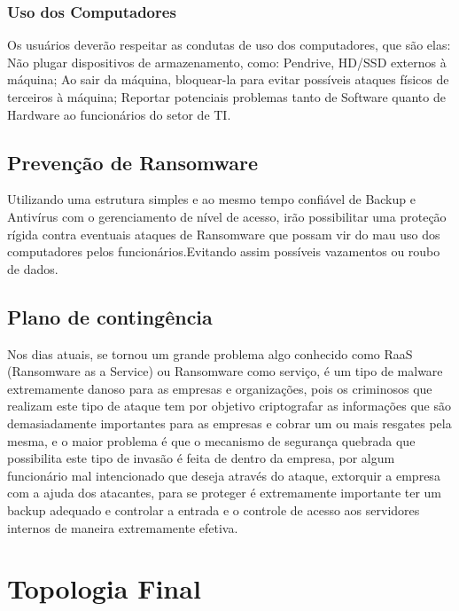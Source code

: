 \documentclass[12pt]{article}
\begin{document}
\subsubsection{Uso dos Computadores}
Os usuários deverão respeitar as condutas de uso dos computadores, que são elas: Não plugar dispositivos de armazenamento, como: Pendrive, HD/SSD externos à máquina; Ao sair da máquina, bloquear-la para evitar possíveis ataques físicos de terceiros à máquina; Reportar potenciais problemas tanto de Software quanto de Hardware ao funcionários do setor de TI.
\subsection{Prevenção de Ransomware}
Utilizando uma estrutura simples e ao mesmo tempo confiável de Backup e Antivírus com o gerenciamento de nível de acesso, irão possibilitar uma proteção rígida contra eventuais ataques de Ransomware que possam vir do mau uso dos computadores pelos funcionários.Evitando assim possíveis vazamentos ou roubo de dados.
\subsection{Plano de contingência}
Nos dias atuais, se tornou um grande problema algo conhecido como RaaS (Ransomware as a Service) ou Ransomware como serviço, é um tipo de malware extremamente danoso para as empresas e organizações, pois os criminosos que realizam este tipo de ataque tem por objetivo criptografar as informações que são demasiadamente importantes para as empresas e cobrar um ou mais resgates pela mesma, e o maior problema é que o mecanismo de segurança quebrada que possibilita este tipo de invasão é feita de dentro da empresa, por algum funcionário mal intencionado que deseja através do ataque, extorquir a empresa com a ajuda dos atacantes, para se proteger é extremamente importante ter um backup adequado e controlar a entrada e o controle de acesso aos servidores internos de maneira extremamente efetiva.
\section{Topologia Final}
\end{document}
